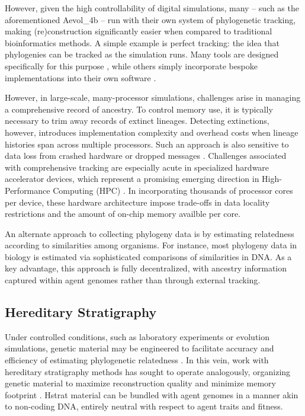 However, given the high controllability of digital simulations, many -- such as the aforementioned Aevol\_4b -- run with their own system of phylogenetic tracking, making (re)construction significantly easier when compared to traditional bioinformatics methods.
A simple example is perfect tracking: the idea that phylogenies can be tracked as the simulation runs. Many tools are designed specifically for this purpose \citep{dolson2024phylotrack}, while others simply incorporate bespoke implementations into their own software \citep{ofria2004avida}.

However, in large-scale, many-processor simulations, challenges arise in managing a comprehensive record of ancestry.
To control memory use, it is typically necessary to trim away records of extinct lineages.
Detecting extinctions, however, introduces implementation complexity and overhead costs when lineage histories span across multiple processors.
Such an approach is also sensitive to data loss from crashed hardware or dropped messages \citep{TODODAVEACKLEY}.
Challenges associated with comprehensive tracking are especially acute in specialized hardware accelerator devices, which represent a promising emerging direction in High-Performance Computing (HPC) \citep{TODO}.
In incorporating thousands of processor cores per device, these hardware architecture impose trade-offs in data locality restrictions and the amount of on-chip memory availble per core.

An alternate approach to collecting phylogeny data is by estimating relatedness according to similarities among organisms.
For instance, most phylogeny data in biology is estimated via sophisticated comparisons of similarities in DNA.
As a key advantage, this approach is fully decentralized, with ancestry information captured within agent genomes rather than through external tracking.

\subsection{Hereditary Stratigraphy} \label{sec:introduction:hstrat}



Under controlled conditions, such as laboratory experiments or evolution simulations, genetic material may be engineered to facilitate accuracy and efficiency of estimating phylogenetic relatedness \citep{li2024reconstructing}.
In this vein, work with hereditary stratigraphy methods has sought to operate analogously, organizing genetic material to maximize reconstruction quality and minimize memory footprint \citep{moreno2022hereditary}.
Hstrat material can be bundled with agent genomes in a manner akin to non-coding DNA, entirely neutral with respect to agent traits and fitness.

